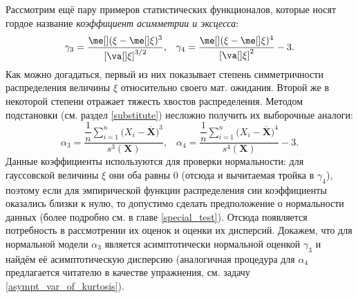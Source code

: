 \begin{example}\label{skewness_and_kurtosis}
    Рассмотрим ещё пару примеров статистических функционалов, которые носят гордое название \textit{коэффициент асимметрии и эксцесса}:
    \[
    \gamma_3 = \frac{\me[] (\xi - \me[]\xi)^3}{\left[\va[] \xi\right]^{3/2}},\;\;\;\gamma_4 = \frac{\me[] (\xi - \me[]\xi)^4}{\left[\va[] \xi\right]^{2}} - 3.
    \]
    Как можно догадаться, первый из них показывает степень симметричности распределения величины $\xi$ относительно своего мат. ожидания. Второй же в некоторой степени отражает тяжесть хвостов распределения. Методом подстановки (см. раздел \ref{substitute}) несложно получить их выборочные аналоги:
    \[
    \alpha_3 = \frac{\dfrac{1}{n}\sum\limits_{i=1}^n \bigl(X_i - \overline{\mathbf X}\bigr)^3}{s^3(\mathbf X)},\;\;\;\alpha_4 = \frac{\dfrac{1}{n}\sum\limits_{i=1}^n \bigl(X_i - \overline{\mathbf X}\bigr)^4}{s^4(\mathbf X)} - 3.
    \]
    Данные коэффициенты используются для проверки нормальности: для гауссовской величины $\xi$ они оба равны 0 (отсюда и вычитаемая тройка в $\gamma_4$), поэтому если для эмпирической функции распределения сии коэффициенты оказались близки к нулю, то допустимо сделать предположение о нормальности данных (более подробно см. в главе \ref{special_test}). Отсюда появляется потребность в рассмотрении их оценок и оценки их дисперсий. Докажем, что для нормальной модели $\alpha_3$ является асимптотически нормальной оценкой $\gamma_3$ и найдём её асимптотическую дисперсию (аналогичная процедура для $\alpha_4$ предлагается читателю в качестве упражнения, см. задачу \ref{asympt_var_of_kurtosis}).


\end{example}
